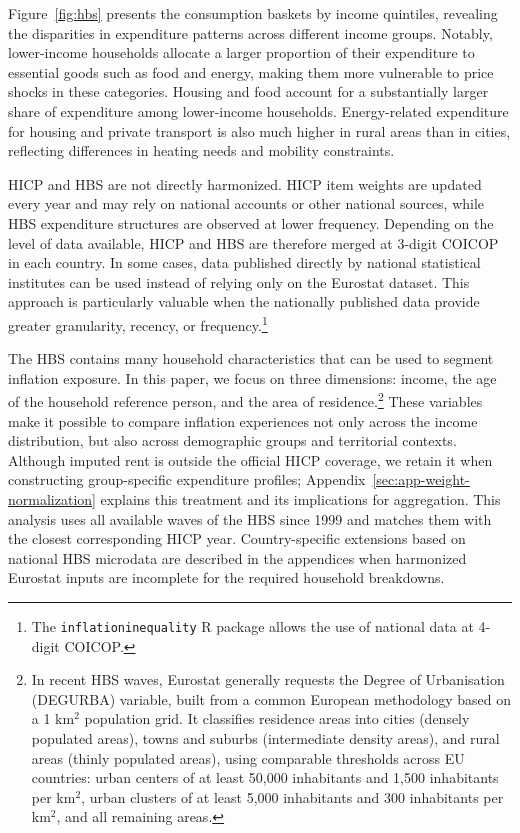 \documentclass[11pt]{article}
\begin{document}
Figure~\ref{fig:hbs} presents the consumption baskets by income quintiles, revealing the disparities
in expenditure patterns across different income groups. Notably, lower-income households allocate a
larger proportion of their expenditure to essential goods such as food and energy, making them more
vulnerable to price shocks in these categories.  Housing and food account for a substantially larger
share of expenditure among lower-income households. Energy-related expenditure for housing and
private transport is also much higher in rural areas than in cities, reflecting differences in
heating needs and mobility constraints.


HICP and HBS are not directly harmonized. HICP item weights are updated every year and may rely on
national accounts or other national sources, while HBS expenditure structures are observed at lower
frequency. Depending on the level of data available, HICP and HBS are therefore merged at 3-digit
COICOP in each country. In some cases, data published directly by national statistical institutes
can be used instead of relying only on the Eurostat dataset. This approach is particularly valuable
when the nationally published data provide greater granularity, recency, or frequency.\footnote{The
\texttt{inflationinequality} R package allows the use of national data at 4-digit COICOP.}

The HBS contains many household characteristics that can be used to segment inflation exposure. In
this paper, we focus on three dimensions: income, the age of the household reference person, and the
area of residence.\footnote{In recent HBS waves, Eurostat generally requests the Degree of
Urbanisation (DEGURBA) variable, built from a common European methodology based on a 1 km$^2$
population grid. It classifies residence areas into cities (densely populated areas), towns and
suburbs (intermediate density areas), and rural areas (thinly populated areas), using comparable
thresholds across EU countries: urban centers of at least 50,000 inhabitants and 1,500 inhabitants
per km$^2$, urban clusters of at least 5,000 inhabitants and 300 inhabitants per km$^2$, and all
remaining areas.} These variables make it possible to compare inflation experiences not only across
the income distribution, but also across demographic groups and territorial contexts. Although
imputed rent is outside the official HICP coverage, we retain it when constructing group-specific
expenditure profiles; Appendix~\ref{sec:app-weight-normalization} explains this treatment and its
implications for aggregation. This analysis uses all
available waves of the HBS since 1999 and matches them with the closest corresponding HICP year.
Country-specific extensions based on national HBS microdata are described in the appendices when
harmonized Eurostat inputs are incomplete for the required household breakdowns.
\end{document}
